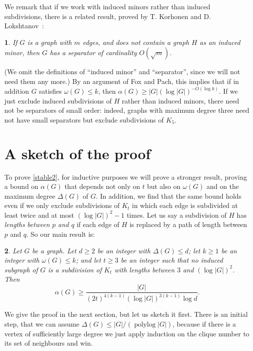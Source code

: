 \documentclass[titlepage,11pt]{article}
\def\polylog{\operatorname{polylog}}
\newtheorem{thm}{}[section]
\begin{document}
We remark that if we work with induced minors rather than induced subdivisions, there is a related result, proved by T. Korhonen and D. Lokshtanov~\cite{korhonen}:
\begin{thm}\label{korhonen}
If $G$ is a graph with $m$ edges, and does not contain a graph $H$ as an induced minor, then 
$G$ has a separator of cardinality $O(\sqrt{m})$. 
\end{thm}
(We omit the definitions of ``induced minor'' and ``separator'', since we will not need them any more.)
By an argument of Fox and Pach, this implies that if in addition $G$ satisfies $\omega(G)\le k$,
then $\alpha(G)\ge |G|(\log |G|)^{-O(\log k)}$. If we just exclude induced subdivisions of $H$ rather than induced minors, 
there need not be separators of small order: indeed, graphs with maximum degree three need not have small separators
but exclude subdivisions of $K_5$.


\section{A sketch of the proof}



To prove \ref{stable2}, for inductive purposes we will prove a stronger result, proving a bound on 
$\alpha(G)$ that depends not only on $t$ but also on $\omega(G)$ and on the maximum degree $\Delta(G)$ of $G$. In addition, we find 
that the same bound holds even if we only exclude subdivisions of $K_t$ in which each edge is subdivided at least twice and at 
most $(\log |G|)^2-1$ times.
Let us say a subdivision of $H$ has {\em lengths between $p$ and $q$} if each edge of $H$ is replaced by a path of length between $p$ and $q$.
So our main result is:

\begin{thm} \label{subdivisionagain}
Let $G$ be a graph. Let $d\ge 2$ be an integer with $\Delta(G)\le d$; let $k\ge 1$ be an integer with $\omega(G)\le k$; and let $t\ge 3$ be an integer
such that no induced subgraph of $G$
is a subdivision of $K_t$ with lengths between $3$ and $(\log |G|)^2$.  Then
$$\alpha(G)\ge \frac{|G|}{(2t)^{4(k-1)}(\log |G|)^{3(k-1)}\log d}.$$
\end{thm}

We give the proof in the next section, but let us sketch it first. 
There is an initial step, that we can assume $\Delta(G)\le |G|/(\polylog|G|)$, because if there is a vertex of sufficiently large 
degree we just apply induction on the clique number to its set of neighbours and win. 
\end{document}
